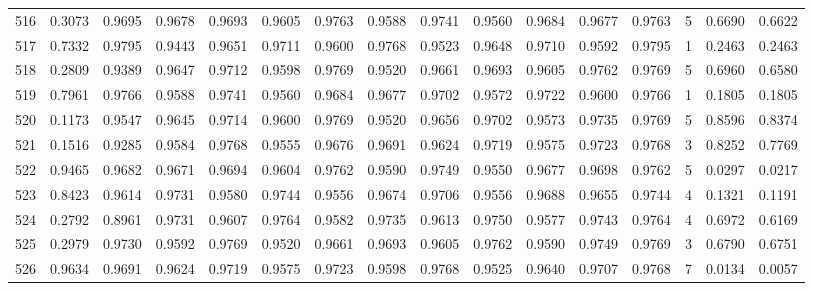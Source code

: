 \begin{tabular}{lrrrrrrrrrrrrrrr}
516 &      0.3073 &  0.9695 &  0.9678 &  0.9693 &  0.9605 &  0.9763 &  0.9588 &  0.9741 &  0.9560 &  0.9684 &   0.9677 &     0.9763 &      5 &                    0.6690 &                     0.6622 \\
517 &      0.7332 &  0.9795 &  0.9443 &  0.9651 &  0.9711 &  0.9600 &  0.9768 &  0.9523 &  0.9648 &  0.9710 &   0.9592 &     0.9795 &      1 &                    0.2463 &                     0.2463 \\
518 &      0.2809 &  0.9389 &  0.9647 &  0.9712 &  0.9598 &  0.9769 &  0.9520 &  0.9661 &  0.9693 &  0.9605 &   0.9762 &     0.9769 &      5 &                    0.6960 &                     0.6580 \\
519 &      0.7961 &  0.9766 &  0.9588 &  0.9741 &  0.9560 &  0.9684 &  0.9677 &  0.9702 &  0.9572 &  0.9722 &   0.9600 &     0.9766 &      1 &                    0.1805 &                     0.1805 \\
520 &      0.1173 &  0.9547 &  0.9645 &  0.9714 &  0.9600 &  0.9769 &  0.9520 &  0.9656 &  0.9702 &  0.9573 &   0.9735 &     0.9769 &      5 &                    0.8596 &                     0.8374 \\
521 &      0.1516 &  0.9285 &  0.9584 &  0.9768 &  0.9555 &  0.9676 &  0.9691 &  0.9624 &  0.9719 &  0.9575 &   0.9723 &     0.9768 &      3 &                    0.8252 &                     0.7769 \\
522 &      0.9465 &  0.9682 &  0.9671 &  0.9694 &  0.9604 &  0.9762 &  0.9590 &  0.9749 &  0.9550 &  0.9677 &   0.9698 &     0.9762 &      5 &                    0.0297 &                     0.0217 \\
523 &      0.8423 &  0.9614 &  0.9731 &  0.9580 &  0.9744 &  0.9556 &  0.9674 &  0.9706 &  0.9556 &  0.9688 &   0.9655 &     0.9744 &      4 &                    0.1321 &                     0.1191 \\
524 &      0.2792 &  0.8961 &  0.9731 &  0.9607 &  0.9764 &  0.9582 &  0.9735 &  0.9613 &  0.9750 &  0.9577 &   0.9743 &     0.9764 &      4 &                    0.6972 &                     0.6169 \\
525 &      0.2979 &  0.9730 &  0.9592 &  0.9769 &  0.9520 &  0.9661 &  0.9693 &  0.9605 &  0.9762 &  0.9590 &   0.9749 &     0.9769 &      3 &                    0.6790 &                     0.6751 \\
526 &      0.9634 &  0.9691 &  0.9624 &  0.9719 &  0.9575 &  0.9723 &  0.9598 &  0.9768 &  0.9525 &  0.9640 &   0.9707 &     0.9768 &      7 &                    0.0134 &                     0.0057 \\

\end{tabular}
